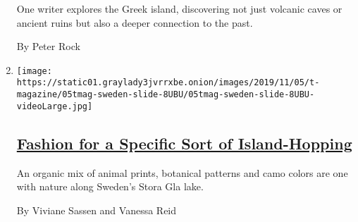 \begin{enumerate}
  One writer explores the Greek island, discovering not just volcanic
  caves or ancient ruins but also a deeper connection to the past.

  By Peter Rock
\item
  \texttt{[image: https://static01.graylady3jvrrxbe.onion/images/2019/11/05/t-magazine/05tmag-sweden-slide-8UBU/05tmag-sweden-slide-8UBU-videoLarge.jpg]}

  \hypertarget{fashion-for-a-specific-sort-of-island-hopping}{%
  \subsection{\texorpdfstring{\href{/2019/11/05/t-magazine/sweden-fall-fashion.html}{Fashion
  for a Specific Sort of
  Island-Hopping}}{Fashion for a Specific Sort of Island-Hopping}}\label{fashion-for-a-specific-sort-of-island-hopping}}

  An organic mix of animal prints, botanical patterns and camo colors
  are one with nature along Sweden's Stora Gla lake.

  By Viviane Sassen and Vanessa Reid
\end{enumerate}

